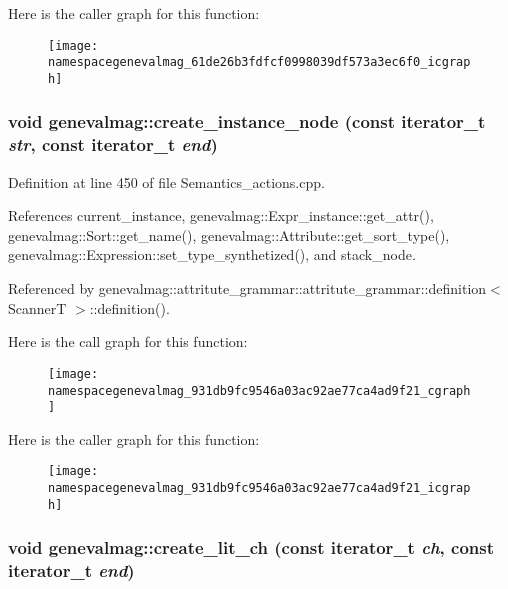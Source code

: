 Here is the caller graph for this function:\nopagebreak
\begin{figure}[H]
\begin{center}
\leavevmode
\texttt{[image: namespacegenevalmag\_61de26b3fdfcf0998039df573a3ec6f0\_icgraph]}
\end{center}
\end{figure}
\hypertarget{namespacegenevalmag_931db9fc9546a03ac92ae77ca4ad9f21}{
\subsubsection[{create\_\-instance\_\-node}]{\setlength{\rightskip}{0pt plus 5cm}void genevalmag::create\_\-instance\_\-node (const iterator\_\-t {\em str}, \/  const iterator\_\-t {\em end})}}
\label{namespacegenevalmag_931db9fc9546a03ac92ae77ca4ad9f21}




Definition at line 450 of file Semantics\_\-actions.cpp.

References current\_\-instance, genevalmag::Expr\_\-instance::get\_\-attr(), genevalmag::Sort::get\_\-name(), genevalmag::Attribute::get\_\-sort\_\-type(), genevalmag::Expression::set\_\-type\_\-synthetized(), and stack\_\-node.

Referenced by genevalmag::attritute\_\-grammar::attritute\_\-grammar::definition$<$ ScannerT $>$::definition().

Here is the call graph for this function:\nopagebreak
\begin{figure}[H]
\begin{center}
\leavevmode
\texttt{[image: namespacegenevalmag\_931db9fc9546a03ac92ae77ca4ad9f21\_cgraph]}
\end{center}
\end{figure}


Here is the caller graph for this function:\nopagebreak
\begin{figure}[H]
\begin{center}
\leavevmode
\texttt{[image: namespacegenevalmag\_931db9fc9546a03ac92ae77ca4ad9f21\_icgraph]}
\end{center}
\end{figure}
\hypertarget{namespacegenevalmag_48bc87a884f21e2f39a19b6ef43bedf9}{
\subsubsection[{create\_\-lit\_\-ch}]{\setlength{\rightskip}{0pt plus 5cm}void genevalmag::create\_\-lit\_\-ch (const iterator\_\-t {\em ch}, \/  const iterator\_\-t {\em end})}}
\label{namespacegenevalmag_48bc87a884f21e2f39a19b6ef43bedf9}





